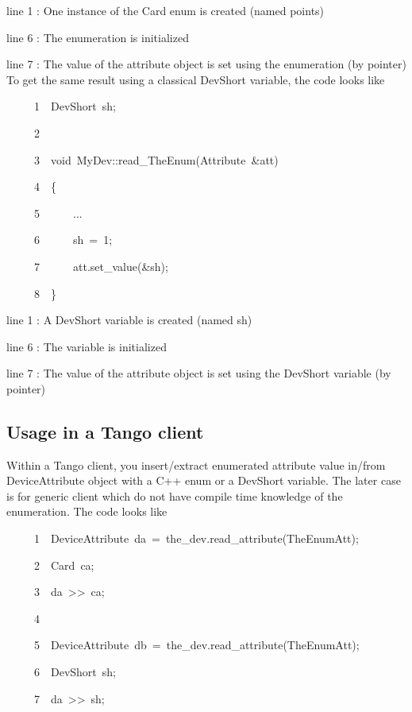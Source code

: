 line 1 : One instance of the Card enum is created (named points)

line 6 : The enumeration is initialized

line 7 : The value of the attribute object is set using the enumeration
(by pointer)\\
To get the same result using a classical DevShort variable, the code
looks like


\begin{lyxcode}
~~~~~1~~DevShort~sh;

~~~~~2~~

~~~~~3~~void~MyDev::read\_TheEnum(Attribute~\&att)

~~~~~4~~\{

~~~~~5~~~~~~...

~~~~~6~~~~~~sh~=~1;

~~~~~7~~~~~~att.set\_value(\&sh);

~~~~~8~~\}
\end{lyxcode}


line 1 : A DevShort variable is created (named sh)

line 6 : The variable is initialized

line 7 : The value of the attribute object is set using the DevShort
variable (by pointer)


\subsection{Usage in a Tango client}

Within a Tango client, you insert/extract enumerated attribute value
in/from DeviceAttribute object with a C++ enum or a DevShort variable.
The later case is for generic client which do not have compile time
knowledge of the enumeration. The code looks like


\begin{lyxcode}
~~~~~1~~DeviceAttribute~da~=~the\_dev.read\_attribute(\textquotedbl{}TheEnumAtt\textquotedbl{});

~~~~~2~~Card~ca;

~~~~~3~~da~>\textcompwordmark{}>~ca;

~~~~~4~~

~~~~~5~~DeviceAttribute~db~=~the\_dev.read\_attribute(\textquotedbl{}TheEnumAtt\textquotedbl{});

~~~~~6~~DevShort~sh;

~~~~~7~~da~>\textcompwordmark{}>~sh;
\end{lyxcode}


